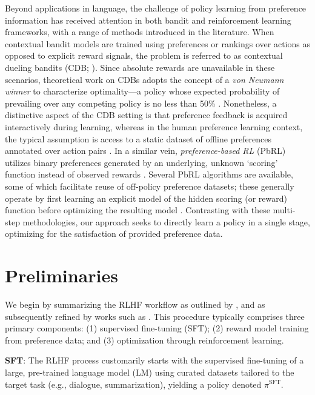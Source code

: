 Beyond applications in language, the challenge of policy learning from preference information has received attention in both bandit and reinforcement learning frameworks, with a range of methods introduced in the literature. When contextual bandit models are trained using preferences or rankings over actions as opposed to explicit reward signals, the problem is referred to as contextual dueling bandits (CDB; \cite{yue2012karmed,dudik2015contextual}). Since absolute rewards are unavailable in these scenarios, theoretical work on CDBs adopts the concept of a \textit{von Neumann winner} to characterize optimality—a policy whose expected probability of prevailing over any competing policy is no less than 50\% \citep{dudik2015contextual}. Nonetheless, a distinctive aspect of the CDB setting is that preference feedback is acquired interactively during learning, whereas in the human preference learning context, the typical assumption is access to a static dataset of offline preferences annotated over action pairs \citep{yan2022human}. In a similar vein, \textit{preference-based RL} (PbRL) utilizes binary preferences generated by an underlying, unknown `scoring' function instead of observed rewards \citep{BusaFekete2014,ruiz2023dueling}. Several PbRL algorithms are available, some of which facilitate reuse of off-policy preference datasets; these generally operate by first learning an explicit model of the hidden scoring (or reward) function before optimizing the resulting model \citep{jain2013learning,BusaFekete2014,christiano2017deep,sadigh2017active,kupcsik2018learning}. Contrasting with these multi-step methodologies, our approach seeks to directly learn a policy in a single stage, optimizing for the satisfaction of provided preference data.

\section{Preliminaries}\label{section:prelims}

We begin by summarizing the RLHF workflow as outlined by \citeauthor{ziegler2020finetuning}, and as subsequently refined by works such as \citep{stiennon2022learning, bai2022training, ouyang2022training}. This procedure typically comprises three primary components: (1) supervised fine-tuning (SFT); (2) reward model training from preference data; and (3) optimization through reinforcement learning.

\textbf{SFT}: The RLHF process customarily starts with the supervised fine-tuning of a large, pre-trained language model (LM) using curated datasets tailored to the target task (e.g., dialogue, summarization), yielding a policy denoted $\pi^\text{SFT}$.

